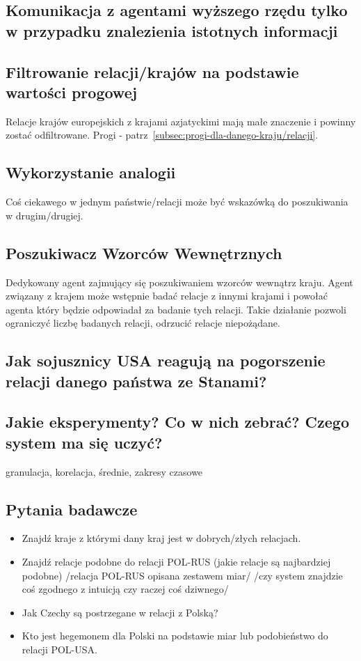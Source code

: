\documentclass[11pt]{report}
\begin{document}
    \subsection{Komunikacja z agentami wyższego rzędu tylko w przypadku znalezienia istotnych informacji}

    \subsection{Filtrowanie relacji/krajów na podstawie wartości progowej}
    Relacje krajów europejskich z krajami azjatyckimi mają małe znaczenie i powinny zostać odfiltrowane.
    Progi - patrz~\ref{subsec:progi-dla-danego-kraju/relacji}.

    \subsection{Wykorzystanie analogii}
    Coś ciekawego w jednym państwie/relacji może być wskazówką do poszukiwania w drugim/drugiej.

    \subsection{Poszukiwacz Wzorców Wewnętrznych}
    Dedykowany agent zajmujący się poszukiwaniem wzorców wewnątrz kraju.
    Agent związany z krajem może wstępnie badać relacje z innymi krajami
    i powołać agenta który będzie odpowiadał za badanie tych relacji.
    Takie działanie pozwoli ograniczyć liczbę badanych relacji, odrzucić relacje niepożądane.

    \subsection{Jak sojusznicy USA reagują na pogorszenie relacji danego państwa ze Stanami?}

    \subsection{Jakie eksperymenty? Co w nich zebrać? Czego system ma się uczyć?}
    granulacja, korelacja, średnie, zakresy czasowe

    \subsection{Pytania badawcze}
    \begin{itemize}
        \item Znajdź kraje z którymi dany kraj jest w dobrych/złych relacjach.
        \item Znajdź relacje podobne do relacji POL-RUS (jakie relacje są najbardziej podobne) /relacja POL-RUS opisana zestawem miar/
        /czy system znajdzie coś zgodnego z intuicją czy raczej coś dziwnego/
        \item Jak Czechy są postrzegane w relacji z Polską?
        \item Kto jest hegemonem dla Polski na podstawie miar lub podobieństwo do relacji POL-USA\@.
    \end{itemize}
\end{document}
